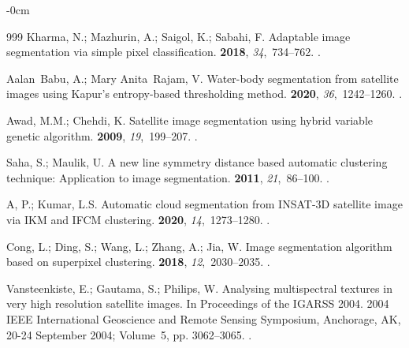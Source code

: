 \documentclass[analytics,article,accept,pdftex,moreauthors]{Definitions/mdpi}
\begin{document}
\begin{adjustwidth}{-\extralength}{0cm}
\begin{thebibliography}{999}
Kharma, N.; Mazhurin, A.; Saigol, K.; Sabahi, F.
\newblock Adaptable image segmentation via simple pixel classification.
 {\bf 2018}, {\em 34},~734--762.
.

Aalan~Babu, A.; Mary Anita~Rajam, V.
\newblock Water-body segmentation from satellite images using Kapur's
  entropy-based thresholding method.
 {\bf 2020}, {\em 36},~1242--1260.
.

Awad, M.M.; Chehdi, K.
\newblock Satellite image segmentation using hybrid variable genetic algorithm.
 {\bf
  2009}, {\em 19},~199--207.
.

Saha, S.; Maulik, U.
\newblock A new line symmetry distance based automatic clustering technique:
  Application to image segmentation.
 {\bf
  2011}, {\em 21},~86--100.
.

A, P.; Kumar, L.S.
\newblock Automatic cloud segmentation from INSAT-3D satellite image via IKM
  and IFCM clustering.
 {\bf 2020}, {\em 14},~1273--1280.
.

Cong, L.; Ding, S.; Wang, L.; Zhang, A.; Jia, W.
\newblock Image segmentation algorithm based on superpixel clustering.
 {\bf 2018}, {\em 12},~2030--2035.
.

Vansteenkiste, E.; Gautama, S.; Philips, W.
\newblock Analysing multispectral textures in very high resolution satellite
  images.
\newblock In Proceedings of the IGARSS 2004. 2004 IEEE International Geoscience
  and Remote Sensing Symposium, Anchorage, AK, 20-24 September 2004; Volume~5, \linebreak pp. 3062--3065.
.


\end{thebibliography}
\end{adjustwidth}
\end{document}
